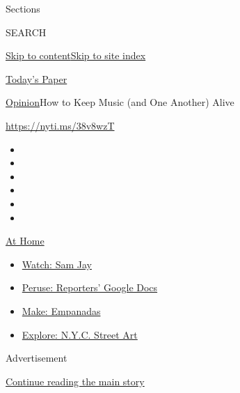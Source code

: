Sections

SEARCH

\protect\hyperlink{site-content}{Skip to
content}\protect\hyperlink{site-index}{Skip to site index}

\href{https://myaccount.nytimes.com/auth/login?response_type=cookie\&client_id=vi}{}

\href{https://www.nytimes.com/section/todayspaper}{Today's Paper}

\href{/section/opinion}{Opinion}\textbar{}How to Keep Music (and One
Another) Alive

\href{https://nyti.ms/38v8wzT}{https://nyti.ms/38v8wzT}

\begin{itemize}
\item
\item
\item
\item
\item
\item
\end{itemize}

\href{https://www.nytimes.com/spotlight/at-home?action=click\&pgtype=Article\&state=default\&region=TOP_BANNER\&context=at_home_menu}{At
Home}

\begin{itemize}
\tightlist
\item
  \href{https://www.nytimes.com/2020/08/04/arts/television/sam-jay-netflix-special.html?action=click\&pgtype=Article\&state=default\&region=TOP_BANNER\&context=at_home_menu}{Watch:
  Sam Jay}
\item
  \href{https://www.nytimes.com/interactive/2020/at-home/even-more-reporters-editors-diaries-lists-recommendations.html?action=click\&pgtype=Article\&state=default\&region=TOP_BANNER\&context=at_home_menu}{Peruse:
  Reporters' Google Docs}
\item
  \href{https://www.nytimes.com/2020/08/04/dining/colombian-empanadas-carlos-gaviria.html?action=click\&pgtype=Article\&state=default\&region=TOP_BANNER\&context=at_home_menu}{Make:
  Empanadas}
\item
  \href{https://www.nytimes.com/2020/08/06/arts/design/street-art-nyc-george-floyd.html?action=click\&pgtype=Article\&state=default\&region=TOP_BANNER\&context=at_home_menu}{Explore:
  N.Y.C. Street Art}
\end{itemize}

Advertisement

\protect\hyperlink{after-top}{Continue reading the main story}

